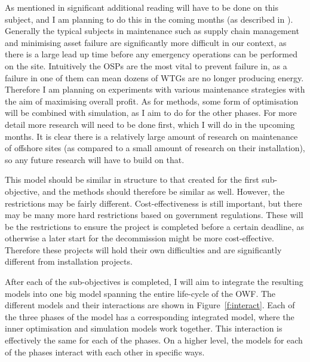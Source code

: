 \documentclass[a4paper,12pt]{article}
\begin{document}

As mentioned in  significant additional reading will have to be done on this subject, and I am planning to do this in the coming months (as described in ). Generally the typical subjects in maintenance such as supply chain management and minimising asset failure are significantly more difficult in our context, as there is a large lead up time before any emergency operations can be performed on the site. Intuitively the OSPs are the most vital to prevent failure in, as a failure in one of them can mean dozens of WTGs are no longer producing energy. Therefore I am planning on experiments with various maintenance strategies with the aim of maximising overall profit. As for methods, some form of optimisation will be combined with simulation, as I aim to do for the other phases. For more detail more research will need to be done first, which I will do in the upcoming months.  It is clear there is a relatively large amount of research on maintenance of offshore sites (as compared to a small amount of research on their installation), so any future research will have to build on that.


This model should be similar in structure to that created for the first sub-objective, and the methods should therefore be similar as well. However, the restrictions may be fairly different. Cost-effectiveness is still important, but there may be many more hard restrictions based on government regulations. These will be the restrictions to ensure the project is completed before a certain deadline, as otherwise a later start for the decommission might be more cost-effective. Therefore these projects will hold their own difficulties and are significantly different from installation projects. 


After each of the sub-objectives is completed, I will aim to integrate the resulting models into one big model spanning the entire life-cycle of the OWF. The different models and their interactions are shown in Figure~\ref{f:interact}. Each of the three phases of the model has a corresponding integrated model, where the inner optimisation and simulation models work together. This interaction is effectively the same for each of the phases. On a higher level, the models for each of the phases interact with each other in specific ways. 
\end{document}

